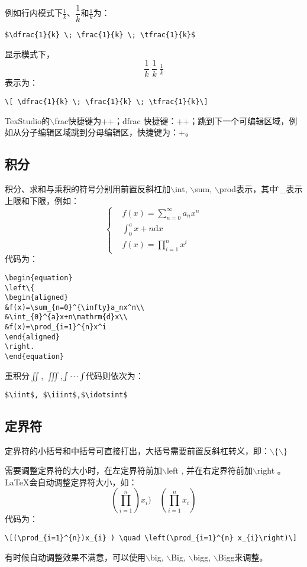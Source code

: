 例如行内模式下$\frac{1}{k}$、$\dfrac{1}{k}$和$\tfrac{1}{k}$为：
\begin{lstlisting}
$\dfrac{1}{k} \; \frac{1}{k} \; \tfrac{1}{k}$
\end{lstlisting}
显示模式下，\[\dfrac{1}{k} \; \frac{1}{k} \; \tfrac{1}{k}\]表示为：
\begin{lstlisting}
\[ \dfrac{1}{k} \; \frac{1}{k} \; \tfrac{1}{k}\]
\end{lstlisting}
TexStudio的$\backslash$frac快捷键为++；dfrac 快捷键：++；跳到下一个可编辑区域，例如从分子编辑区域跳到分母编辑区，快捷键为：+。

\subsection{积分}
积分、求和与乘积的符号分别用前置反斜杠加$\backslash$int, $\backslash$sum, $\backslash$prod表示，其中\^和\_表示上限和下限，例如：
\begin{equation}\label{eq:intsumprod}
\left\{
\begin{aligned}
&f(x)=\sum_{n=0}^{\infty}a_nx^n\\
&\int_{0}^{a}x+n\mathrm{d}x\\
&f(x)=\prod_{i=1}^{n}x^i
\end{aligned}
\right.
\end{equation}
代码为：
\begin{lstlisting}
\begin{equation}
\left\{
\begin{aligned}
&f(x)=\sum_{n=0}^{\infty}a_nx^n\\
&\int_{0}^{a}x+n\mathrm{d}x\\
&f(x)=\prod_{i=1}^{n}x^i
\end{aligned}
\right.
\end{equation}
\end{lstlisting}
重积分$\iint$, $\iiint$,$\idotsint$代码则依次为：
\begin{lstlisting}
$\iint$, $\iiint$,$\idotsint$
\end{lstlisting}
\subsection{定界符}
定界符的小括号和中括号可直接打出，大括号需要前置反斜杠转义，即：$\backslash\{\backslash\}$

需要调整定界符的大小时，在左定界符前加$\backslash$left , 并在右定界符前加$\backslash$right 。\LaTeX 会自动调整定界符大小，如：\[(\prod_{i=1}^{n})x_{i} ) \quad \left(\prod_{i=1}^{n} x_{i}\right)\]代码为：
\begin{lstlisting}
\[(\prod_{i=1}^{n})x_{i} ) \quad \left(\prod_{i=1}^{n} x_{i}\right)\]
\end{lstlisting}
有时候自动调整效果不满意，可以使用$\backslash$big, $\backslash$Big, $\backslash$bigg, $\backslash$Bigg来调整。

